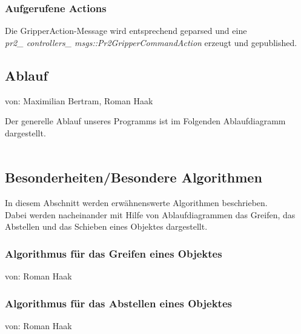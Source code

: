 \documentclass{suturo}
\makeatletter
\newcommand{\chapterauthor}[1]{%
  {\parindent0pt\vspace*{-27pt}%
  \linespread{0}\small\begin{flushright}von: #1\end{flushright}%
  \par\nobreak\vspace*{0pt}}
  \@afterheading%
}
\makeatother
\begin{document}
\subsubsection{Aufgerufene Actions}
Die GripperAction-Message wird entsprechend geparsed und eine \\
 \textit{pr2\_ controllers\_ msgs::Pr2GripperCommandAction} erzeugt und gepublished. \\

\newpage

\subsection{Ablauf}
\chapterauthor{Maximilian Bertram, Roman Haak}
Der generelle Ablauf unseres Programms ist im Folgenden Ablaufdiagramm dargestellt.\\\\


\begin{figure}[!htb]
\end{figure}


\newpage

\subsection{Besonderheiten/Besondere Algorithmen}
In diesem Abschnitt werden erwähnenswerte Algorithmen beschrieben.\\
Dabei werden nacheinander mit Hilfe von Ablaufdiagrammen das Greifen, das Abstellen und das Schieben eines Objektes dargestellt.\\

\subsubsection{Algorithmus für das Greifen eines Objektes}
\chapterauthor{Roman Haak}

\begin{figure}[!htb]
\end{figure}

\newpage

\subsubsection{Algorithmus für das Abstellen eines Objektes}
\chapterauthor{Roman Haak}
\end{document}
